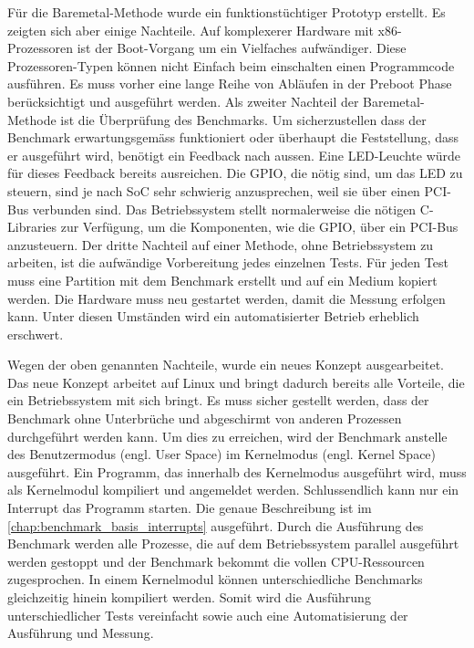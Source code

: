 Für die Baremetal-Methode wurde ein funktionstüchtiger Prototyp erstellt. Es zeigten sich aber einige Nachteile. Auf komplexerer Hardware mit x86-Prozessoren ist der Boot-Vorgang um ein Vielfaches aufwändiger\cite{intel_boot_process}. Diese Prozessoren-Typen können nicht Einfach beim einschalten einen Programmcode ausführen. Es muss vorher eine lange Reihe von Abläufen in der Preboot Phase berücksichtigt und ausgeführt werden. Als zweiter Nachteil der Baremetal-Methode ist die Überprüfung des Benchmarks. Um sicherzustellen dass der Benchmark erwartungsgemäss funktioniert oder überhaupt die Feststellung, dass er ausgeführt wird, benötigt ein Feedback nach aussen. Eine LED-Leuchte würde für dieses Feedback bereits ausreichen. Die GPIO, die nötig sind, um das LED zu steuern, sind je nach SoC sehr schwierig anzusprechen, weil sie über einen PCI-Bus verbunden sind. Das Betriebssystem stellt normalerweise die nötigen C-Libraries zur Verfügung, um die Komponenten, wie die GPIO, über ein PCI-Bus anzusteuern. Der dritte Nachteil auf einer Methode, ohne Betriebssystem zu arbeiten, ist die aufwändige Vorbereitung jedes einzelnen Tests. Für jeden Test muss eine Partition mit dem Benchmark erstellt und auf ein Medium kopiert werden. Die Hardware muss neu gestartet werden,
damit die Messung erfolgen kann. Unter diesen Umständen wird ein automatisierter Betrieb erheblich erschwert.
\par
Wegen der oben genannten Nachteile, wurde ein neues Konzept ausgearbeitet. Das neue Konzept arbeitet auf Linux und bringt dadurch bereits alle Vorteile, die ein Betriebssystem mit sich bringt. Es muss sicher gestellt werden, dass der Benchmark ohne Unterbrüche und abgeschirmt von anderen Prozessen durchgeführt werden kann. Um dies zu erreichen, wird der Benchmark anstelle des Benutzermodus (engl. User Space) im Kernelmodus (engl. Kernel Space) ausgeführt\cite{Mandl2010}. Ein Programm, das innerhalb des Kernelmodus ausgeführt wird, muss als Kernelmodul kompiliert und angemeldet werden. Schlussendlich kann nur ein Interrupt das Programm starten. Die genaue Beschreibung ist im \autoref{chap:benchmark_basis_interrupts} ausgeführt. Durch die Ausführung des Benchmark werden alle Prozesse, die auf dem Betriebssystem parallel ausgeführt werden gestoppt und der Benchmark bekommt die vollen CPU-Ressourcen zugesprochen. In einem Kernelmodul können unterschiedliche Benchmarks gleichzeitig hinein kompiliert werden. Somit wird die Ausführung unterschiedlicher Tests vereinfacht sowie auch eine Automatisierung der Ausführung und Messung.

 



 
